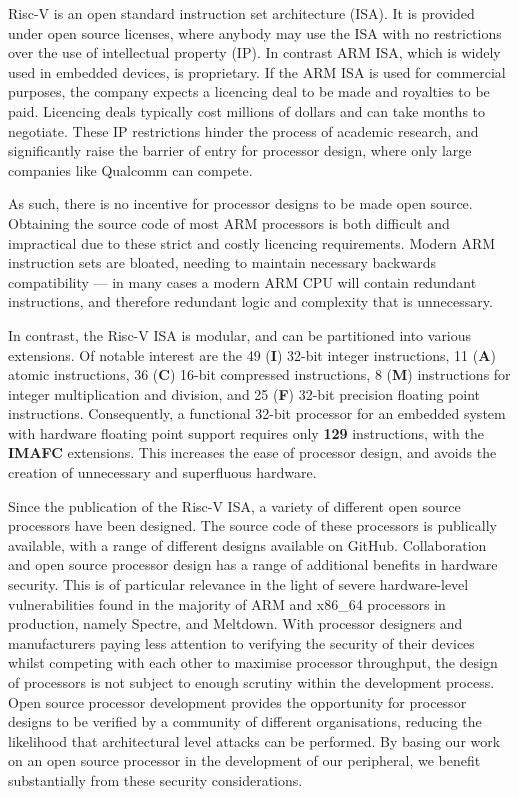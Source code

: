 \documentclass[a4paper,8pt]{report}
\begin{document}
Risc-V is an open standard instruction set architecture (ISA). It is provided
under open source licenses, where anybody may use the ISA with no restrictions
over the use of intellectual property (IP). In contrast ARM ISA, which is widely
used in embedded devices, is proprietary. If the ARM ISA is used
for commercial purposes, the company expects a licencing deal to be made and
royalties to be paid. Licencing deals typically cost millions of dollars and can
take months to negotiate. These IP restrictions hinder the process of academic
research, and significantly raise the barrier of entry for processor design,
where only large companies like Qualcomm can compete.

As such, there is no incentive for processor designs to be made open source.
Obtaining the source code of most ARM processors is both difficult and
impractical due to these strict and costly licencing requirements. Modern ARM
instruction sets are bloated, needing to maintain necessary backwards
compatibility --- in many cases a modern ARM CPU will contain redundant
instructions, and therefore redundant logic and complexity that is unnecessary.

In contrast, the Risc-V ISA is modular, and can be partitioned into various extensions. Of
notable interest are the 49 (\textbf{I}) 32-bit integer instructions, 11
(\textbf{A}) atomic instructions, 36 (\textbf{C}) 16-bit compressed instructions, 8
(\textbf{M}) instructions for integer multiplication and division, and 25
(\textbf{F}) 32-bit precision floating point instructions. Consequently, a
functional 32-bit processor for an embedded system with hardware floating point
support requires only \textbf{129} instructions, with the \textbf{IMAFC}
extensions. This increases the ease of processor design, and avoids the creation
of unnecessary and superfluous hardware. 


Since the publication of the Risc-V ISA\cite{Waterman:EECS-2014-54}, a variety of different open source
processors have been designed. The source code of these processors is publically
available, with a range of different designs available on GitHub. Collaboration
and open source processor design has a range of additional benefits in hardware
security. This is of particular relevance in the light of severe hardware-level
vulnerabilities found in the majority of ARM and x86\_64 processors in
production, namely Spectre, and Meltdown. With processor designers and
manufacturers paying less attention to verifying the security of their devices
whilst competing with each other to maximise processor throughput, the design of
processors is not subject to enough scrutiny within the development process.
Open source processor development provides the opportunity for processor designs
to be verified by a community of different organisations, reducing the
likelihood that architectural level attacks can be performed. By basing our work
on an open source processor in the development of our peripheral, we benefit
substantially from these security considerations.
\end{document}

